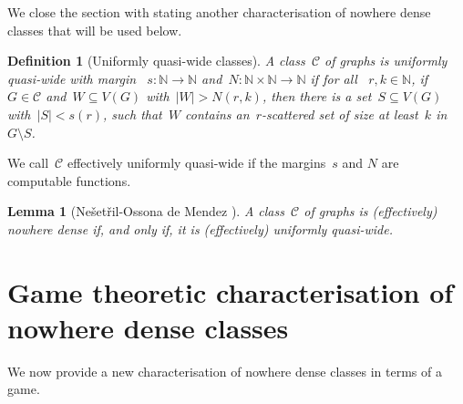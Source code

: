 \documentclass[11pt]{article}
\newtheorem{lemma}[theorem]{Lemma}
\newtheorem{definition}[theorem]{Definition}
\numberwithin{equation}{section}
\newcommand{\N}{{\mathbb N}} \newcommand{\Q}{{\mathbb Q}}
\newcommand{\CCC}{\mathcal{C}} \newcommand{\DDD}{\mathcal{D}}
\begin{document}



We close the section with stating another characterisation of nowhere
dense classes that will be used below.

\begin{definition}[Uniformly quasi-wide classes]
  A class~$\CCC$ of graphs is \emph{uniformly quasi-wide} with margin
 ~$s:\N\rightarrow \N$ and~$N:\N\times\N\rightarrow \N$ if for all
 ~$r,k\in\N$, if~$G\in \CCC$ and~$W\subseteq V(G)$ with~$|W|>N(r,k)$,
  then there is a set~$S\subseteq V(G)$ with~$|S|<s(r)$, such that~$W$
  contains an~$r$-scattered set of size at least~$k$ in~$G \setminus S$.
\end{definition}

We call~$\CCC$ effectively uniformly quasi-wide if the margins~$s$ and
$N$ are computable functions.

\begin{lemma}[Ne{\v s}et{\v r}il-Ossona de Mendez
  \cite{NesetrilO11}]\label{thm:ndtouqw}
  A class~$\CCC$ of graphs is (effectively) nowhere dense if, and only
  if, it is (effectively) uniformly quasi-wide.
\end{lemma}





\section{Game theoretic characterisation of nowhere dense classes}
\label{sec:game}
We now provide a new characterisation of nowhere dense classes in
terms of a game.%
\end{document}
